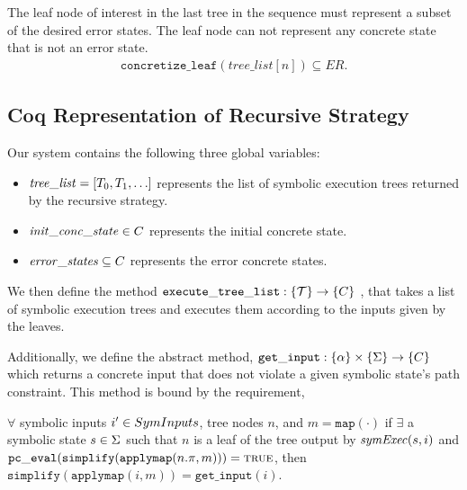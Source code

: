 \setcounter{property}{1}
\renewcommand{\theproperty}{Z.\arabic{property}'} 
\begin{property}
  The leaf node of interest in the last tree in the
  sequence must represent a subset of the desired error states. The leaf node
  can not represent any concrete state that is not an error state.
  \label{prop:correctedz2}
  \begin{align*}
    \mathtt{concretize\_leaf}(\mathit{tree\_list}[n]) \subseteq \mathit{ER}.
  \end{align*}

 \end{property}
 
 
\subsection{Coq Representation of Recursive Strategy}
Our system contains the following three global variables:
\begin{itemize}
\item $\mathit{tree\_list} = [T_0, T_1, \ldots]$ represents the list of symbolic execution trees returned by the recursive strategy.
\item $\mathit{init\_conc\_state} \in C$ represents the initial concrete state.
\item $\mathit{error\_states} \subseteq C$ represents the error concrete states.
\end{itemize}

We then define the method $ \mathtt{execute\_tree\_list} : \{ \mathcal{T} \} \rightarrow \{C\}$ , that takes a list of symbolic execution trees and executes them according to the inputs given by the leaves.

Additionally, we define the abstract method, $ \mathtt{get\_input} : \{\alpha\} \times \{\Sigma\} \rightarrow \{C\}$ which returns a concrete input that does not violate a given symbolic state's path constraint.
This method is bound by the requirement,

\begin{definition}
$ \forall$ symbolic inputs $i' \in SymInputs$, tree nodes $n$, and $m = \mathtt{map(\cdot)}$
if $\exists$ a symbolic state $s \in \Sigma$  such that
$n$ is a leaf of the tree output by $\mathit{symExec}(s, i)$ and 
$\mathtt{pc\_eval} (\mathtt{simplify}(\mathtt{applymap} (n.\pi, m))) = \mathtt{\textsc{true}}$, then
$\mathtt{simplify}(\mathtt{applymap} (i, m)) = \mathtt{get\_input}(i)$.
\end{definition}




